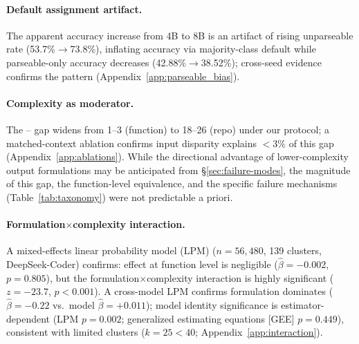 \paragraph{Default assignment artifact.} The apparent \cwm{} accuracy increase from 4B to 8B is an artifact of rising unparseable rate (53.7\%$\to$73.8\%), inflating accuracy via majority-class default while parseable-only accuracy decreases (42.88\%$\to$38.52\%); cross-seed evidence confirms the pattern (Appendix~\ref{app:parseable_bias}).

\paragraph{Complexity as moderator.} The \cls{}--\cwm{} gap widens from 1--3\pp{} (function) to 18--26\pp{} (repo) under our protocol; a matched-context ablation confirms input disparity explains $<$3\% of this gap (Appendix~\ref{app:ablations}). While the directional advantage of lower-complexity output formulations may be anticipated from \S\ref{sec:failure-modes}, the magnitude of this gap, the function-level equivalence, and the specific failure mechanisms (Table~\ref{tab:taxonomy}) were not predictable a priori.

\paragraph{Formulation$\times$complexity interaction.} A mixed-effects linear probability model (LPM) ($n{=}56{,}480$, 139 clusters, DeepSeek-Coder) confirms: \cwm{} effect at function level is negligible ($\hat{\beta}{=}-0.002$, $p{=}0.805$), but the formulation$\times$complexity interaction is highly significant ($z{=}-23.7$, $p{<}0.001$). A cross-model LPM confirms formulation dominates ($\hat{\beta}{=}-0.22$ vs.\ model $\hat{\beta}{=}+0.011$); model identity significance is estimator-dependent (LPM $p{=}0.002$; generalized estimating equations [GEE] $p{=}0.449$), consistent with limited clusters ($k{=}25 < 40$; Appendix~\ref{app:interaction}).

\begin{table}[t]
\centering
\small
\caption{Repo-level failure mode taxonomy. Variant-level majority baseline: 54.17\%.}
\label{tab:taxonomy}
\setlength{\tabcolsep}{3pt}
\end{table}

